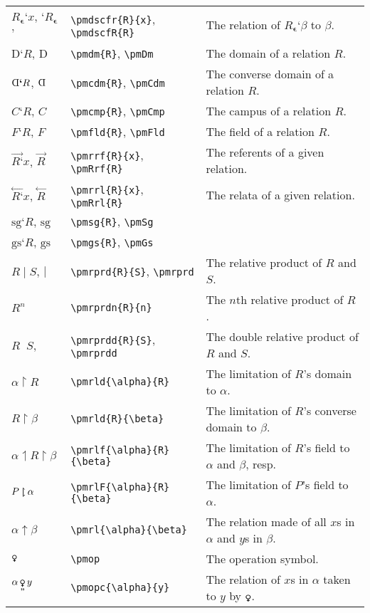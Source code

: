 \documentclass[12pt]{article}
\newcommand{\pmcin}{\mathop{\boldsymbol{\epsilon}}} %
\newcommand{\pmrrf}[2]{\overset{\boldsymbol{\rightarrow}}{#1\textbf{`}}#2} %
\newcommand{\pmRrf}[1]{\overset{\boldsymbol{\rightarrow}}{#1}}
\newcommand{\pmrrl}[2]{\overset{\boldsymbol{\leftarrow}}{#1\textbf{`}}#2} %
\newcommand{\pmRrl}[1]{\overset{\boldsymbol{\leftarrow}}{#1}}
\newcommand{\pmsg}[1]{\text{sg}\textbf{`}#1} %
\newcommand{\pmSg}{\text{sg}}
\newcommand{\pmgs}[1]{\text{gs}\textbf{`}#1} %
\newcommand{\pmGs}{\text{gs}}
\newcommand{\pmdm}[1]{\text{D}\textbf{`}#1} %
\newcommand{\pmDm}{\text{D}}
\newcommand{\pmcdm}[1]{\text{\rotatebox[origin=c]{180}{D}}\textbf{`}#1} %
\newcommand{\pmCdm}{\text{\rotatebox[origin=c]{180}{D}}}
\newcommand{\pmcmp}[1]{C\textbf{`}#1} %
\newcommand{\pmCmp}{C}
\newcommand{\pmfld}[1]{F\textbf{`}#1} %
\newcommand{\pmFld}{F}
\newcommand{\pmrprd}[2]{{#1}\mathop{|}{#2}} %
\newcommand{\pmRprd}{\mathop{|}}
\newcommand{\pmrprdn}[2]{#1^{#2}} %
\newcommand{\pmrld}[2]{#1 \boldsymbol{\upharpoonleft} #2} %
\newcommand{\pmrlcd}[2]{#1 \boldsymbol{\upharpoonright} #2} %
\newcommand{\pmrlf}[3]{#1 \boldsymbol{\upharpoonleft} #2 \boldsymbol{\upharpoonright} #3} %
\newcommand{\pmrl}[2]{#1 \boldsymbol{\uparrow} #2} %
\newcommand{\pmrlF}[2]{#1 \mathbin{\ooalign{$\upharpoonright$\cr\hidewidth\rotatebox[origin=c]{180}{\text{$\upharpoonleft$}}\hidewidth\cr}} #2} %
\newcommand{\pmdscfr}[2]{#1_{\pmcin}\textbf{`}#2} %
\newcommand{\pmdscfR}[1]{#1_{\pmcin}}
\newcommand{\Female}{{\usefont{U}{mvs}{m}{n}\symbol{126}}} %
\newcommand{\pmop}{\mathop{\text{\Female}}} %
\newcommand{\pmopc}[2]{#1 \mathop{\underset{\textbf{''}}{\text{\Female}}} #2} %
\newcommand{\pmrprdd}[2]{{#1}\mathop{||}{#2}} %
\newcommand{\pmRprdd}{\mathop{||}}
\begin{document}
\noindent \begin{tabular}{@{}p{3cm} | p{5cm} | p{8.25cm}}
	$\pmdscfr{R}{x}$, `$\pmdscfR{R}$'& \verb|\pmdscfr{R}{x}|, \verb|\pmdscfR{R}| & The relation of $\pmdscfr{R}{\beta}$ to $\beta$. \\
	$\pmdm{R}$, $\pmDm$ & \verb|\pmdm{R}|, \verb|\pmDm| & The domain of a relation $R$.  \\
	$\pmcdm{R}$, $\pmCdm$ & \verb|\pmcdm{R}|, \verb|\pmCdm| & The converse domain of a relation $R$. \\
	$\pmcmp{R}$, $\pmCmp$ & \verb|\pmcmp{R}|, \verb|\pmCmp| & The campus of a relation $R$.  \\
	$\pmfld{R}$, $\pmFld$ & \verb|\pmfld{R}|, \verb|\pmFld| & The field of a relation $R$. \\
	$\pmrrf{R}{x}$, $\pmRrf{R}$ & \verb|\pmrrf{R}{x}|, \verb|\pmRrf{R}| & The referents of a given relation. \\
	$\pmrrl{R}{x}$, $\pmRrl{R}$ & \verb|\pmrrl{R}{x}|, \verb|\pmRrl{R}| & The relata of a given relation. \\
	$\pmsg{R}$, $\pmSg$ & \verb|\pmsg{R}|, \verb|\pmSg| &  \\
	$\pmgs{R}$, $\pmGs$ & \verb|\pmgs{R}|, \verb|\pmGs| &  \\
	$\pmrprd{R}{S}$, $\pmRprd$ & \verb|\pmrprd{R}{S}|, \verb|\pmrprd| &  The relative product of $R$ and $S$. \\
	$\pmrprdn{R}{n}$ & \verb|\pmrprdn{R}{n}| & The $n$th relative product of $R$. \\
	$\pmrprdd{R}{S}$, $\pmRprdd$ & \verb|\pmrprdd{R}{S}|, \verb|\pmrprdd| &  The double relative product of $R$ and $S$. \\
	$\pmrlcd{\alpha}{R}$ & \verb|\pmrld{\alpha}{R}| & The limitation of $R$'s domain to $\alpha$. \\
	$\pmrlcd{R}{\beta}$ & \verb|\pmrld{R}{\beta}| & The limitation of $R$'s converse domain to $\beta$. \\
	$\pmrlf{\alpha}{R}{\beta}$ & \verb|\pmrlf{\alpha}{R}{\beta}| & The limitation of $R$'s field to $\alpha$ and $\beta$, resp. \\ 
	$\pmrlF{P}{\alpha}$ & \verb|\pmrlF{\alpha}{R}{\beta}| & The limitation of $P$'s field to $\alpha$. \\ 
	$\pmrl{\alpha}{\beta}$ & \verb|\pmrl{\alpha}{\beta}| & The relation made of all $x$s in $\alpha$ and $y$s in $\beta$. \\
	$\pmop$ & \verb|\pmop| & The operation symbol. \\
	$\pmopc{\alpha}{y}$ & \verb|\pmopc{\alpha}{y}| & The relation of $x$s in $\alpha$ taken to $y$ by $\pmop$. \\

\end{tabular}
\end{document}
